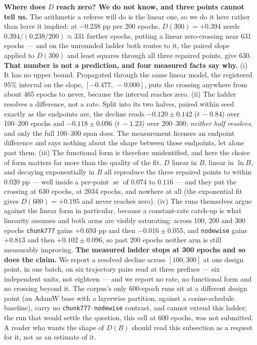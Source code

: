\documentclass[10pt,letterpaper]{article}
\newcommand{\Dstat}{D}                         %
\newcommand{\arm}[1]{\texttt{#1}}
\DeclareMathOperator{\se}{se}
\begin{document}
\textbf{Where does $\Dstat$ reach zero? We do not know, and three points cannot tell us.} The
arithmetic a referee will do is the linear one, so we do it here rather than leave it implied: at
$-0.238$ pp per 200 epochs, $\Dstat(300) = +0.394$ needs $0.394 / (0.238/200) \approx 331$ further
epochs, putting a linear zero-crossing near 631 epochs --- and on the unrounded ladder both routes
to it, the paired slope applied to $\Dstat(300)$ and least squares through all three repaired
points, give 630. \textbf{That number is not a prediction, and four measured facts say why.}
(i) It has no upper bound. Propagated through the same linear model, the registered 95\% interval
on the slope, $[-0.477,\ -0.000]$, puts the crossing anywhere from about 465 epochs to never,
because the interval reaches zero. (ii) The ladder resolves a difference, not a rate. Split into
its two halves, paired within seed exactly as the endpoints are, the decline reads
$-0.120 \pm 0.142$ ($t\ -0.84$) over 100--200 epochs and $-0.118 \pm 0.096$ ($t\ -1.23$) over
200--300: \emph{neither half resolves}, and only the full 100--300 span does. The measurement
licenses an endpoint difference and says nothing about the shape between those endpoints, let
alone past them. (iii) The functional form is therefore unidentified, and here the choice of form
matters far more than the quality of the fit. $\Dstat$ linear in $B$, linear in $\ln B$, and
decaying exponentially in $B$ all reproduce the three repaired points to within $0.020$ pp ---
well inside a per-point $\se$ of $0.074$ to $0.116$ --- and they put the crossing at 630 epochs, at
2034 epochs, and nowhere at all (the exponential fit gives $\Dstat(600) = +0.195$ and never reaches
zero). (iv) The runs themselves argue against the linear form in particular, because a
constant-rate catch-up is what linearity assumes and both arms are visibly saturating: across
100, 200 and 300 epochs \arm{chunk777} gains $+0.693$ pp and then $-0.016 \pm 0.055$, and
\arm{nodewise} gains $+0.813$ and then $+0.102 \pm 0.096$, so past 200 epochs neither arm is still
measurably improving. \textbf{The measured ladder stops at 300 epochs and so does the claim.} We
report a resolved decline across $[100, 300]$ at one design point, in one batch, on six trajectory
pairs read at three prefixes --- six independent units, not eighteen --- and we report no rate, no
functional form and no crossing beyond it. The corpus's only 600-epoch runs sit at a different
design point (an AdamW base with a layerwise partition, against a cosine-schedule baseline), carry
no \arm{chunk777}--\arm{nodewise} contrast, and cannot extend this ladder; the run that would
settle the question, this cell at 600 epochs, was not submitted. A reader who wants the shape of
$\Dstat(B)$ should read this subsection as a request for it, not as an estimate of it.
\end{document}

